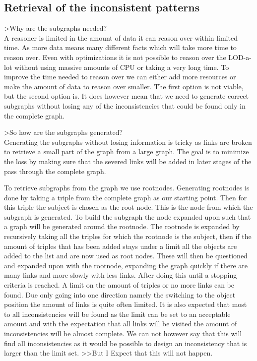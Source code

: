 \documentclass{article}
\begin{document}
\subsection{Retrieval of the inconsistent patterns}
>Why are the subgraphs needed?\\

A reasoner is limited in the amount of data it can reason over within limited time. As more data means many different facts which will take more time to reason over. Even with optimizations it is not possible to reason over the LOD-a-lot without using massive amounts of CPU or taking a very long time. To improve the time needed to reason over we can either add more resources or make the amount of data to reason over smaller. The first option is not viable, but the second option is. 
It does however mean that we need to generate correct subgraphs without losing any of the inconsistencies that could be found only in the complete graph.

>So how are the subgraphs generated?\\
Generating the subgraphs without losing information is tricky as links are broken to retrieve a small part of the graph from a large graph. The goal is to minimize the loss by making sure that the severed links will be added in later stages of the pass through the complete graph.

To retrieve subgraphs from the graph we use rootnodes. Generating rootnodes is done by taking a triple from the complete graph as our starting point. Then for this triple the subject is chosen as the root node. This is the node from which the subgraph is generated. To build the subgraph the node expanded upon such that a graph will be generated around the rootnode. 
The rootnode is expanded by recursively taking all the triples for which the rootnode is the subject, then if the amount of triples that has been added stays under a limit all the objects are added to the list and are now used as root nodes. These will then be questioned and expanded upon with the rootnode, expanding the graph quickly if there are many links and more slowly with less links. After doing this until a stopping criteria is reached. A limit on the amount of triples or no more links can be found. Due only going into one direction namely the switching to the object position the amount of links is quite often limited. 
It is also expected that most to all inconsistencies will be found as the limit can be set to an acceptable amount and with the expectation that all links will be visited the amount of inconsistencies will be almost complete. We can not however say that this will find all inconsistencies as it would be possible to design an inconsistency that is larger than the limit set. >>But I Expect that this will not happen.
\end{document}
